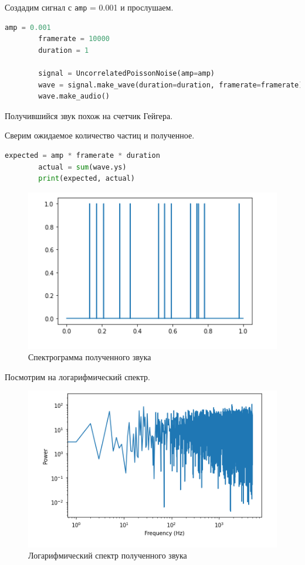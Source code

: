 \documentclass[a4paper, 14pt]{extarticle}
\begin{document}
    Создадим сигнал с \texttt{amp} = 0.001 и прослушаем.

    \begin{lstlisting}[language=Python, caption= Создание и прослушивание сигнала, label={lst:make_uncorrelated_poisson_noise_audio}]
        amp = 0.001
        framerate = 10000
        duration = 1

        signal = UncorrelatedPoissonNoise(amp=amp)
        wave = signal.make_wave(duration=duration, framerate=framerate)
        wave.make_audio()
    \end{lstlisting}

    Получившийся звук похож на счетчик Гейгера.

    Сверим ожидаемое количество частиц и полученное.

    \begin{lstlisting}[language=Python, caption= Сравнение ожидаемых частиц и полученных, label={lst:compare_result}]
        expected = amp * framerate * duration
        actual = sum(wave.ys)
        print(expected, actual)
    \end{lstlisting}

    \begin{figure}[H]
        \centering
        \includegraphics[width=0.8\linewidth]{poisson_wave}
        \caption{Спектрограмма полученного звука}
        \label{fig:poisson_wave}
    \end{figure}

    Посмотрим на логарифмический спектр.

    \begin{figure}[H]
        \centering
        \includegraphics[width=0.8\linewidth]{poisson_log_spectrum}
        \caption{Логарифмический спектр полученного звука}
        \label{fig:poisson_log_spectrum}
    \end{figure}
\end{document}
